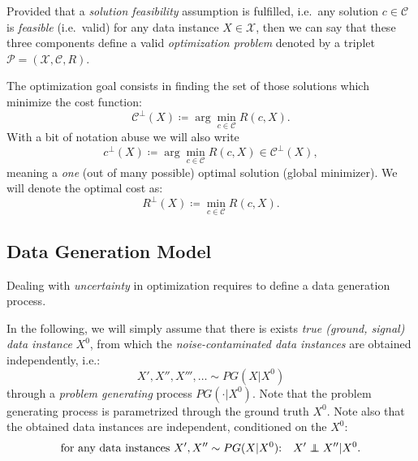 \begin{definition}\label{def:optimization_problem_definition}
  Provided that a \textit{solution feasibility} assumption is fulfilled, i.e.~any
  solution $c \in \mathcal{C}$ is \textit{feasible} (i.e.~valid) for any data
  instance $X \in \mathcal{X}$, then we can say that these three components define a
  valid \textit{optimization problem} denoted by a triplet $\mathcal{P} =
  (\mathcal{X}, \mathcal{C}, R)$.
\end{definition}

The optimization goal consists in finding the
set of those solutions which minimize the cost function:
\begin{equation}
  \mathcal{C}^\bot(X) \coloneqq \arg \min_{c \in \mathcal{C}} R(c, X).
\end{equation}
%
With a bit of notation abuse we will also write
\begin{equation}
  c^\bot(X) \coloneqq \arg \min_{c \in \mathcal{C}} R(c, X) \in \mathcal{C}^\bot(X),
\end{equation}
meaning a \textit{one} (out of many possible) optimal solution (global
minimizer). We will denote the optimal cost as:
\begin{equation}
  R^\bot(X) \coloneqq  \min_{c \in \mathcal{C}} R(c, X).
\end{equation}
%

\subsection{Data Generation Model}
\label{sec:data_generation_model}

Dealing with \textit{uncertainty} in optimization requires to define a data
generation process.

In the following, we will simply assume that there is exists \textit{true
(ground, signal) data instance} $X^0$, from which the \textit{noise-contaminated
data instances} are obtained independently, i.e.:
\begin{equation}\label{eq:data_gen_model}
  X', X'', X''', \dots \sim PG(X | X^0)
\end{equation}
through a \textit{problem generating} process $PG(\cdot | X^0)$. 
%
Note that the problem generating process is parametrized through the ground
truth $X^0$. Note also that the obtained data instances are independent,
conditioned on the $X^0$:
\begin{equation}\label{eq:pg_independence}
  \text{for any data instances $X', X'' \sim PG(X | X^0)$:\quad } X'
  \independent X'' | X^0.
\end{equation}  

